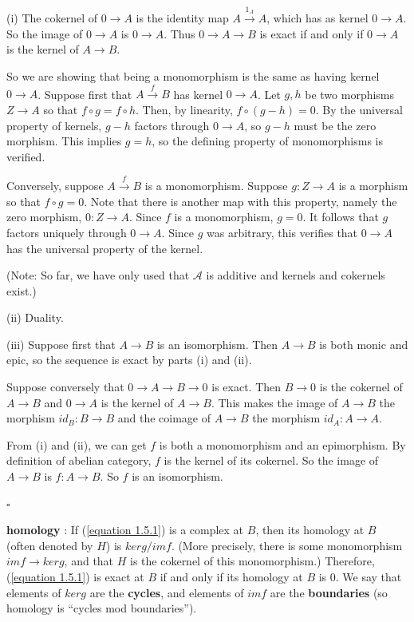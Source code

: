 \documentclass{article}
\newenvironment{Proof}{{\noindent \indent \it Proof:\quad}}{\hfill $\square$\par}
\begin{document}
\begin{Proof}
    (i) The cokernel of $0 \rightarrow A$ is the identity map $A \xrightarrow{1_A} A$, which has as kernel $0 \rightarrow A$. So the image of $0 \rightarrow A$ is $0 \rightarrow A$. Thus $0 \rightarrow A \rightarrow B$ is exact if and only if $0 \rightarrow A$ is the kernel of $A \rightarrow B$.

    So we are showing that being a monomorphism is the same as having kernel $0 \rightarrow A$. Suppose first that $A \xrightarrow{f} B$ has kernel $0 \rightarrow A$. Let $g, h$ be two morphisms $Z \rightarrow A$ so that $f \circ g = f \circ h$. Then, by linearity, $f \circ (g − h) = 0$. By the universal property of kernels, $g − h$ factors through $0 \rightarrow A$, so $g - h$ must be the zero morphism. This implies $g = h$, so the defining property of monomorphisms is verified.

    Conversely, suppose $A \xrightarrow{f} B$ is a monomorphism. Suppose $g : Z \rightarrow A$ is a morphism so that $f \circ g = 0$. Note that there is another map with this property, namely the zero morphism, $0 : Z \rightarrow A$. Since $f$ is a monomorphism, $g = 0$. It follows that $g$ factors uniquely through $0 \rightarrow A$. Since $g$ was arbitrary, this verifies that $0 \rightarrow A$ has the universal property of the kernel.
    
(Note: So far, we have only used that $\mathscr A$ is additive and kernels and cokernels
exist.)

(ii) Duality.

(iii) Suppose first that $A \rightarrow B$ is an isomorphism. Then $A \rightarrow B$ is both monic and epic,
so the sequence is exact by parts (i) and (ii).

Suppose conversely that $0 \rightarrow A \rightarrow B \rightarrow 0$ is exact. Then $B \rightarrow 0$ is the cokernel
of $A \rightarrow B$ and $0 \rightarrow A$ is the kernel of $A \rightarrow B$. This makes the image of $A \rightarrow B$ the
morphism $id_B : B \rightarrow B$ and the coimage of $A \rightarrow B$ the morphism $id_A : A \rightarrow A$. 

From (i) and (ii), we can get $f$ is both a monomorphism and an epimorphism. By definition of abelian category, $f$ is  the kernel of its cokernel. So the image of $A\rightarrow B$ is $f : A\rightarrow B$. So $f$ is an isomorphism.

\end{Proof}

\textbf{homology} : If (\ref{equation 1.5.1}) is a complex at $B$, then its homology at $B$ (often denoted by $H$) is
$ker g / im f$. (More precisely, there is some monomorphism $im f \rightarrow ker g$, and that $H$ is the cokernel of this monomorphism.) Therefore, (\ref{equation 1.5.1}) is exact at $B$ if and only if its homology at $B$ is $0$.
We say that elements of $ker g$ are the \textbf{cycles}, and
elements of $im f$ are the \textbf{boundaries} (so homology is “cycles mod boundaries”).
\end{document}
